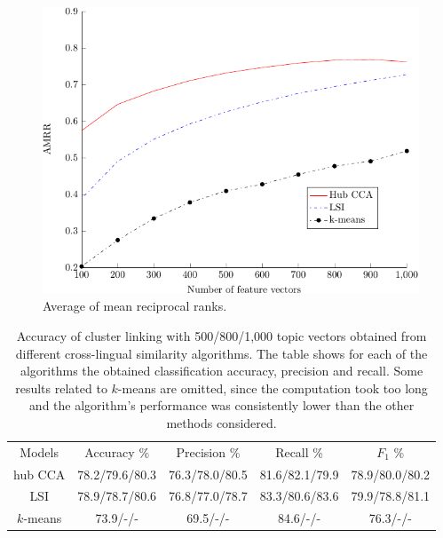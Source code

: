 \begin{figure}
\centering
\includegraphics{figures/retrieval.pdf}
\caption{Average of mean reciprocal ranks.}
\label{pic:AMRR}
\end{figure}

\begin{table}[t]
\caption[Accuracy of cluster linking for several cross-lingual similarity models]{Accuracy of cluster linking with 500/800/1,000 topic vectors obtained from
different cross-lingual similarity algorithms. The table shows for each of the algorithms
the obtained classification accuracy, precision and recall. Some results related to $k$-means
are omitted, since the computation took too long and the algorithm's performance was consistently
lower than the other methods considered.}
\begin{center}
\begin{tabular}{|c|c|c|c|c|}
  \hline
  \cline{1-5}
  Models & Accuracy \% & Precision \% & Recall \% & $F_1$ \% \\ \cline{1-5}
  hub CCA  & 78.2/79.6/80.3 & 76.3/78.0/80.5  & 81.6/82.1/79.9 & 78.9/80.0/80.2
  \\ \cline{1-5}
  LSI      & 78.9/78.7/80.6  & 76.8/77.0/78.7 & 83.3/80.6/83.6 & 79.9/78.8/81.1  \\ \cline{1-5}
 $k$-means & 73.9/-/- & 69.5/-/- & 84.6/-/- &  76.3/-/- \\ \cline{1-5}
\end{tabular}
\end{center}
\label{table:linkingEvalAlgos}
\end{table}

